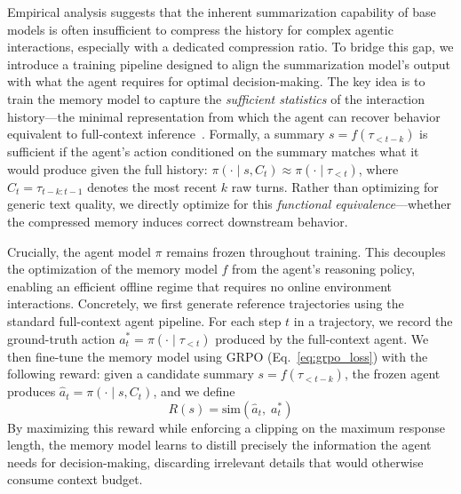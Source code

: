 Empirical analysis suggests that the inherent summarization capability of base models is often insufficient to compress the history for complex agentic interactions, especially with a dedicated compression ratio.
To bridge this gap, we introduce a training pipeline designed to align the summarization model's output with what the agent requires for optimal decision-making.
The key idea is to train the memory model to capture the \emph{sufficient statistics} of the interaction history---the minimal representation from which the agent can recover behavior equivalent to full-context inference~\cite{sutton1998reinforcement}. Formally, a summary $s = f(\tau_{<t-k})$ is sufficient if the agent's action conditioned on the summary matches what it would produce given the full history: $\pi(\cdot \mid s, C_t) \approx \pi(\cdot \mid \tau_{<t})$, where $C_t = \tau_{t-k:t-1}$ denotes the most recent $k$ raw turns. Rather than optimizing for generic text quality, we directly optimize for this \emph{functional equivalence}---whether the compressed memory induces correct downstream behavior.

Crucially, the agent model $\pi$ remains frozen throughout training. This decouples the optimization of the memory model $f$ from the agent's reasoning policy, enabling an efficient offline regime that requires no online environment interactions. Concretely, we first generate reference trajectories using the standard full-context agent pipeline. For each step $t$ in a trajectory, we record the ground-truth action $a_t^* = \pi(\cdot \mid \tau_{<t})$ produced by the full-context agent.
We then fine-tune the memory model using GRPO (Eq.~\ref{eq:grpo_loss}) with the following reward: given a candidate summary $s = f(\tau_{<t-k})$, the frozen agent produces $\hat{a}_t = \pi(\cdot \mid s, C_t)$, and we define
\begin{equation}
R(s) = \text{sim}(\hat{a}_t,\; a_t^*)
\end{equation}
By maximizing this reward while enforcing a clipping on the maximum response length, the memory model learns to distill precisely the information the agent needs for decision-making, discarding irrelevant details that would otherwise consume context budget.